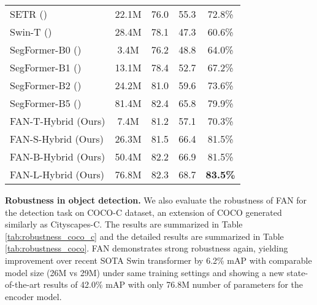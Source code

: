 \documentclass[nohyperref]{article}
\theoremstyle{plain}
\theoremstyle{definition}
\theoremstyle{remark}
\begin{document}
\begin{table}[h]
{\begin{tabular}{l|cccc}
    \midrule
    SETR (\citeauthor{heo2021rethinking}) &  22.1M  & 76.0 &  55.3  & 72.8\% \\ 
    Swin-T (\citeauthor{liu2021swin})  &  28.4M  & 78.1 &  47.3  &  60.6\% \\ 
    SegFormer-B0 (\citeauthor{xie2021segformer})  &  3.4M  & 76.2 &  48.8  &  64.0\% \\ 
    SegFormer-B1 (\citeauthor{xie2021segformer})  & 13.1M  & 78.4 &  52.7  &  67.2\% \\
    SegFormer-B2 (\citeauthor{xie2021segformer})  &  24.2M  & 81.0 &  59.6  &  73.6\% \\ 
    SegFormer-B5 (\citeauthor{xie2021segformer})  &  81.4M  & 82.4 &  65.8  &  79.9\% \\ 
    \midrule
    FAN-T-Hybrid (Ours)  &  7.4M  & 81.2 &  57.1  &  70.3\%  \\ 
    FAN-S-Hybrid (Ours)   & 26.3M  & 81.5 &  66.4  &  81.5\% \\
    FAN-B-Hybrid (Ours)   &  50.4M  & 82.2 &  66.9  &  81.5\% \\ 
    FAN-L-Hybrid (Ours)   & 76.8M &  82.3  & 68.7   & \textbf{83.5\%} \\ 
    \bottomrule
    \end{tabular}
    }
\vspace{-6mm}
\end{table}

\textbf{Robustness in object detection.} We also evaluate the robustness of FAN  for the detection task on COCO-C dataset, an extension of COCO generated similarly as Cityscapes-C. The results are summarized in Table \ref{tab:robustness_coco_c} and the detailed results are summarized in Table \ref{tab:robustness_coco}. FAN demonstrates strong robustness again, yielding improvement over recent SOTA Swin transformer \cite{liu2021swin} by 6.2\% mAP with comparable model size (26M vs 29M) under same training settings and showing a new state-of-the-art results of 42.0\% mAP with only 76.8M number of parameters for the encoder model. 
\end{document}
